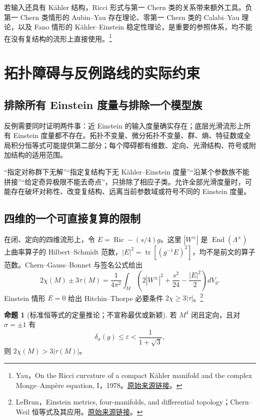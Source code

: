\documentclass[11pt,a4paper]{article}
\theoremstyle{definition}
\newtheorem{proposition}[definition]{命题}
\newcommand{\Ric}{\operatorname{Ric}}
\newcommand{\tr}{\operatorname{tr}}
\newcommand{\src}[3]{\footnote{\raggedright #1，#2。\href{#3}{原始来源链接}。}}
\begin{document}
若输入还具有 Kähler 结构，Ricci 形式与第一 Chern 类的关系带来额外工具。负第一 Chern 类情形的 Aubin--Yau 存在理论、零第一 Chern 类的 Calabi--Yau 理论，以及 Fano 情形的 Kähler--Einstein 稳定性理论，是重要的参照体系，均不能在没有复结构的流形上直接使用。\src{Yau}{On the Ricci curvature of a compact Kähler manifold and the complex Monge--Ampère equation, I，1978}{https://doi.org/10.1002/cpa.3160310304}

\section{拓扑障碍与反例路线的实际约束}\label{sec:obstruction}

\subsection{排除所有 Einstein 度量与排除一个模型族}

反例需要同时证明两件事：近 Einstein 的输入度量确实存在；底层光滑流形上所有 Einstein 度量都不存在。拓扑不变量、微分拓扑不变量、群、熵、特征数或全局积分恒等式可能提供第二部分；每个障碍都有维数、定向、光滑结构、符号或附加结构的适用范围。

“指定对称群下无解”“指定复结构下无 Kähler--Einstein 度量”“沿某个参数族不能拼接”“给定奇异极限不能去奇点”，只排除了相应子类。允许全部光滑度量时，可能存在破坏对称性、改变复结构、远离当前参数域或符号不同的 Einstein 度量。

\subsection{四维的一个可直接复算的限制}

在闭、定向的四维流形上，令 $E=\Ric-(s/4)g$。这里 $|W^\pm|$ 是 $\operatorname{End}(\Lambda^\pm)$ 上曲率算子的 Hilbert--Schmidt 范数，$|E|^2=\tr[(g^{-1}E)^2]$，均不是前文的算子范数。Chern--Gauss--Bonnet 与签名公式给出
\begin{equation}\label{eq:GB}
2\chi(M)\pm3\tau(M)=\frac1{4\pi^2}\int_M
\left(2|W^\pm|^2+\frac{s^2}{24}-\frac{|E|^2}{2}\right)dV_g.
\end{equation}
Einstein 情形 $E=0$ 给出 Hitchin--Thorpe 必要条件 $2\chi\ge3|\tau|$。\src{LeBrun}{Einstein metrics, four-manifolds, and differential topology；Chern--Weil 恒等式及其应用}{https://arxiv.org/abs/math/0404359}

\begin{proposition}[标准恒等式的定量推论；不宣称最优或新颖]\label{prop:gap}
若 $M^4$ 闭且定向，且对 $\sigma=\pm1$ 有
\[
\delta_\sigma(g)\le\varepsilon<\frac{1}{1+\sqrt3},
\]
则 $2\chi(M)>3|\tau(M)|$。
\end{proposition}
\end{document}

